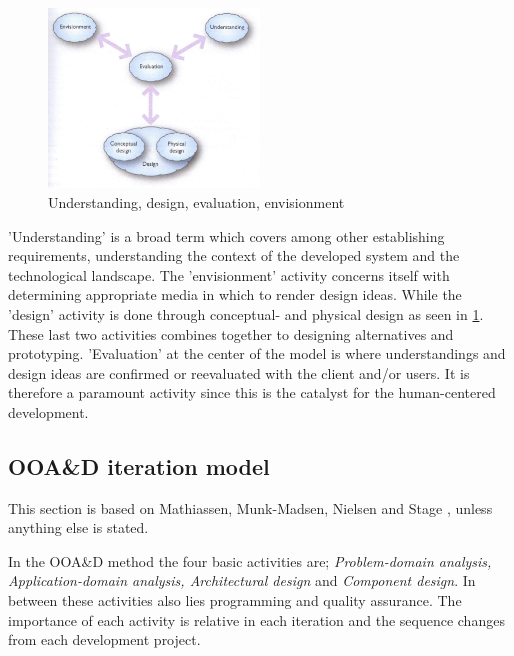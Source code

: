 \begin{figure}[H]
	\centering
	\includegraphics[width=0.5\textwidth]{billeder/DEBModel.jpg}
	\caption{Understanding, design, evaluation, envisionment \citep[p.~49]{Benyon}}\label{fig:DEBModel}
\end{figure}
'Understanding' is a broad term which covers among other establishing requirements, understanding the context of the developed system and the technological landscape.
The 'envisionment' activity concerns itself with determining appropriate media in which to render design ideas.
While the 'design' activity is done through conceptual- and physical design as seen in \cref{fig:DEBModel}.
These last two activities combines together to designing alternatives and prototyping.
'Evaluation' at the center of the model is where understandings and design ideas are confirmed or reevaluated with the client and/or users.
It is therefore a paramount activity since this is the catalyst for the human-centered development.




\subsection{OOA\&D iteration model}\label{sec:Iterative3}
This section is based on Mathiassen, Munk-Madsen, Nielsen and Stage \cite{Rod-Aalborg}, unless anything else is stated.

In the OOA\&D method the four basic activities are; \textit{Problem-domain analysis, Application-domain analysis, Architectural design} and \textit{Component design}.
In between these activities  also lies programming and quality assurance.
The importance of each activity is relative in each iteration and the sequence changes from each development project.

